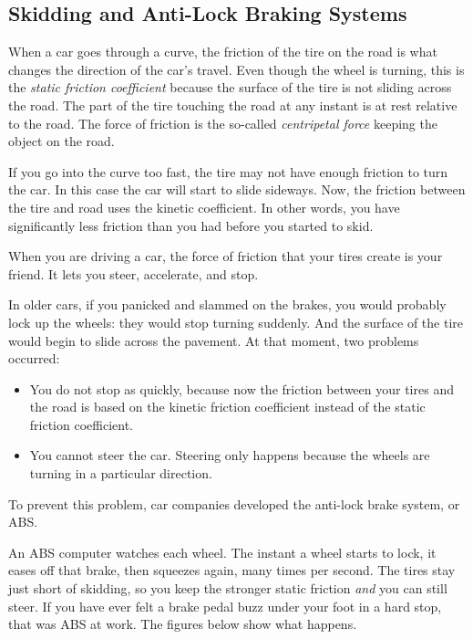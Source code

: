\subsection{Skidding and Anti-Lock Braking Systems}

When a car goes through a curve, the friction of the tire on the road is what changes the direction of the 
car's travel. Even though the wheel is turning, this is the \emph{static friction coefficient} because the surface of the tire is not sliding across the road. The part of the tire touching the road at any instant is at rest relative to the road. The force of friction is the so-called \emph{centripetal force} keeping the object on the road.

If you go into the curve too fast, the tire may not have enough friction to turn the car. In this case the car will start to slide sideways. Now, the friction between the tire and road uses the kinetic coefficient. In other words, you have significantly less friction than you had before you started to skid.

When you are driving a car, the force of friction that your tires create is your friend. It lets you steer, accelerate, and stop.

In older cars, if you panicked and slammed on the brakes, you would probably lock up the wheels: they would stop turning suddenly. And the surface of the tire would begin to slide across the pavement. At that moment, two problems occurred:
\begin{itemize}
\item You do not stop as quickly, because now the friction between your tires and the road is based on the kinetic friction coefficient instead of the static friction coefficient.
\item You cannot steer the car. Steering only happens because the wheels are turning in a particular direction.
\end{itemize}

To prevent this problem, car companies developed the anti-lock brake system, or ABS.

An ABS computer watches each wheel. The instant a wheel starts to lock, it eases off that brake, then squeezes again, many times per second. The tires stay just short of skidding, so you keep the stronger static friction \emph{and} you can still steer. If you have ever felt a brake pedal buzz under your foot in a hard stop, that was ABS at work. The figures below show what happens.

